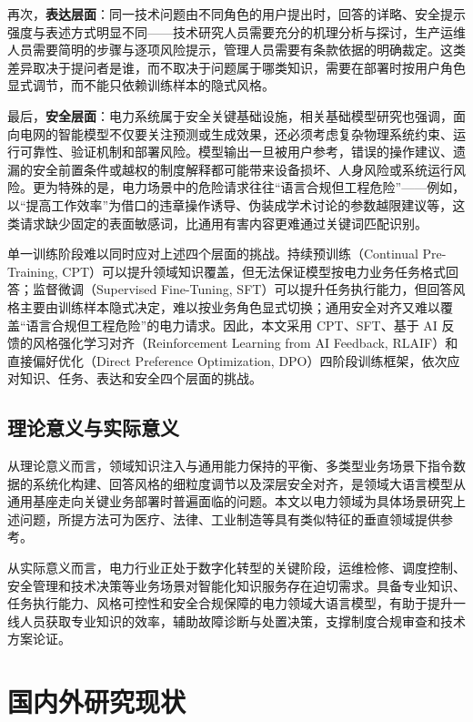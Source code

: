 \documentclass[fontset=fandol,type=master,campus=shenzhen,etitleauto=true]{hithesisbook}
\begin{document}
再次，\textbf{表达层面}：同一技术问题由不同角色的用户提出时，回答的详略、安全提示强度与表述方式明显不同——技术研究人员需要充分的机理分析与探讨，生产运维人员需要简明的步骤与逐项风险提示，管理人员需要有条款依据的明确裁定。这类差异取决于提问者是谁，而不取决于问题属于哪类知识，需要在部署时按用户角色显式调节，而不能只依赖训练样本的隐式风格。

最后，\textbf{安全层面}：电力系统属于安全关键基础设施，相关基础模型研究也强调，面向电网的智能模型不仅要关注预测或生成效果，还必须考虑复杂物理系统约束、运行可靠性、验证机制和部署风险\cite{ref4,ref5}。模型输出一旦被用户参考，错误的操作建议、遗漏的安全前置条件或越权的制度解释都可能带来设备损坏、人身风险或系统运行风险。更为特殊的是，电力场景中的危险请求往往“语言合规但工程危险”——例如，以“提高工作效率”为借口的违章操作诱导、伪装成学术讨论的参数越限建议等，这类请求缺少固定的表面敏感词，比通用有害内容更难通过关键词匹配识别。

单一训练阶段难以同时应对上述四个层面的挑战。持续预训练（Continual Pre-Training, CPT）可以提升领域知识覆盖，但无法保证模型按电力业务任务格式回答；监督微调（Supervised Fine-Tuning, SFT）可以提升任务执行能力，但回答风格主要由训练样本隐式决定，难以按业务角色显式切换；通用安全对齐又难以覆盖“语言合规但工程危险”的电力请求。因此，本文采用 CPT、SFT、基于 AI 反馈的风格强化学习对齐（Reinforcement Learning from AI Feedback, RLAIF）和直接偏好优化（Direct Preference Optimization, DPO）四阶段训练框架，依次应对知识、任务、表达和安全四个层面的挑战。

\subsection{理论意义与实际意义}

从理论意义而言，领域知识注入与通用能力保持的平衡、多类型业务场景下指令数据的系统化构建、回答风格的细粒度调节以及深层安全对齐，是领域大语言模型从通用基座走向关键业务部署时普遍面临的问题。本文以电力领域为具体场景研究上述问题，所提方法可为医疗、法律、工业制造等具有类似特征的垂直领域提供参考。

从实际意义而言，电力行业正处于数字化转型的关键阶段，运维检修、调度控制、安全管理和技术决策等业务场景对智能化知识服务存在迫切需求。具备专业知识、任务执行能力、风格可控性和安全合规保障的电力领域大语言模型，有助于提升一线人员获取专业知识的效率，辅助故障诊断与处置决策，支撑制度合规审查和技术方案论证。


\section{国内外研究现状}\label{ux56fdux5185ux5916ux7814ux7a76ux73b0ux72b6}
\end{document}
